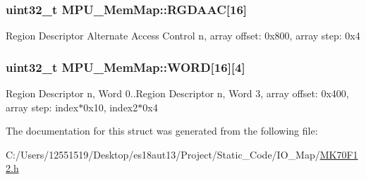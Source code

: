 \subsubsection[{R\+G\+D\+A\+A\+C}]{\setlength{\rightskip}{0pt plus 5cm}uint32\+\_\+t M\+P\+U\+\_\+\+Mem\+Map\+::\+R\+G\+D\+A\+A\+C\mbox{[}16\mbox{]}}\label{struct_m_p_u___mem_map_a7f9c813f610ff2ffa2027cec351b0b1f}
Region Descriptor Alternate Access Control n, array offset\+: 0x800, array step\+: 0x4 \hypertarget{struct_m_p_u___mem_map_ac0f1b1c2b2f2b70a90e02302add086f1}{}
\subsubsection[{W\+O\+R\+D}]{\setlength{\rightskip}{0pt plus 5cm}uint32\+\_\+t M\+P\+U\+\_\+\+Mem\+Map\+::\+W\+O\+R\+D\mbox{[}16\mbox{]}\mbox{[}4\mbox{]}}\label{struct_m_p_u___mem_map_ac0f1b1c2b2f2b70a90e02302add086f1}
Region Descriptor n, Word 0..Region Descriptor n, Word 3, array offset\+: 0x400, array step\+: index$\ast$0x10, index2$\ast$0x4 

The documentation for this struct was generated from the following file\+:\begin{DoxyCompactItemize}
\item 
C\+:/\+Users/12551519/\+Desktop/es18aut13/\+Project/\+Static\+\_\+\+Code/\+I\+O\+\_\+\+Map/\hyperlink{_m_k70_f12_8h}{M\+K70\+F12.\+h}\end{DoxyCompactItemize}
